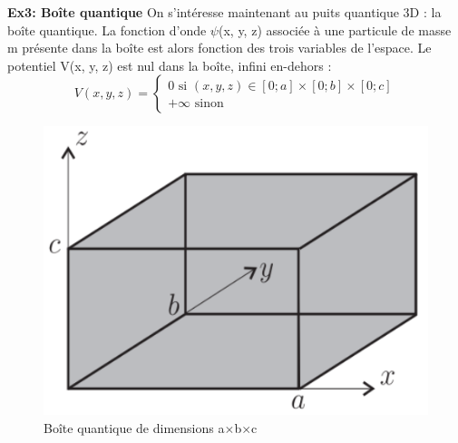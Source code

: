 \documentclass{article}
\begin{document}
\noindent\textbf{Ex3: Boîte quantique}\newline
On s'intéresse maintenant au puits quantique 3D : la boîte quantique. La fonction d'onde $\psi$(x, y, z) associée à une particule de masse m présente dans la boîte est alors fonction des trois variables de l'espace. Le potentiel V(x, y, z) est nul dans la boîte, infini en-dehors :
\[ V(x,y,z)= \left\{
    \begin{array}{c}
        0 \text{ si } (x,y,z) \in [0;a] \times [0;b] \times [0;c] \\
        +\infty \text{ sinon}
    \end{array}
\]

\begin{figure}[h]
    \centering
    \includegraphics[scale=0.3]{figure2.png}
    \caption{Boîte quantique de dimensions a$\times$b$\times$c}
\end{figure}
\end{document}
